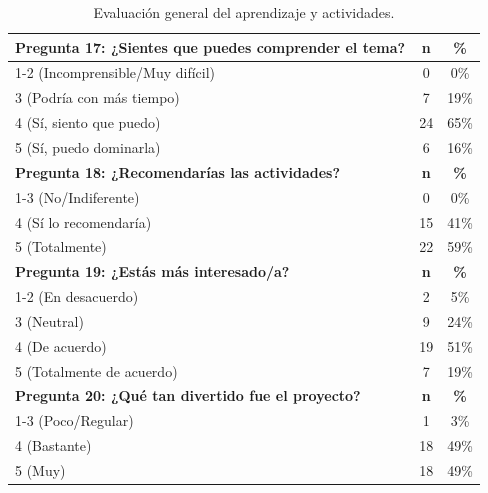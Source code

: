 \documentclass[10pt,a4paper]{article}
\begin{document}
\begin{table}[h!]
\centering
\caption{Evaluación general del aprendizaje y actividades.}
\begin{tabular}{|l|c|c|}
\hline
\textbf{Pregunta 17: ¿Sientes que puedes comprender el tema?} & \textbf{n} & \textbf{\%} \\
\hline
1-2 (Incomprensible/Muy difícil) & 0 & 0\% \\
3 (Podría con más tiempo) & 7 & 19\% \\
4 (Sí, siento que puedo) & 24 & 65\% \\
5 (Sí, puedo dominarla) & 6 & 16\% \\
\hline
\textbf{Pregunta 18: ¿Recomendarías las actividades?} & \textbf{n} & \textbf{\%} \\
\hline
1-3 (No/Indiferente) & 0 & 0\% \\
4 (Sí lo recomendaría) & 15 & 41\% \\
5 (Totalmente) & 22 & 59\% \\
\hline
\textbf{Pregunta 19: ¿Estás más interesado/a?} & \textbf{n} & \textbf{\%} \\
\hline
1-2 (En desacuerdo) & 2 & 5\% \\
3 (Neutral) & 9 & 24\% \\
4 (De acuerdo) & 19 & 51\% \\
5 (Totalmente de acuerdo) & 7 & 19\% \\
\hline
\textbf{Pregunta 20: ¿Qué tan divertido fue el proyecto?} & \textbf{n} & \textbf{\%} \\
\hline
1-3 (Poco/Regular) & 1 & 3\% \\
4 (Bastante) & 18 & 49\% \\
5 (Muy) & 18 & 49\% \\
\hline
\end{tabular}
\end{table}
\end{document}
